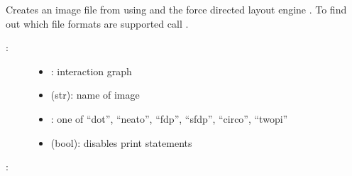 \documentclass[letterpaper,10pt,english]{sphinxmanual}
\begin{document}
\begin{fulllineitems}
\label{\detokenize{InteractionGraphs:PyBoolNet.InteractionGraphs.igraph2image}}
Creates an image file from  using {\hyperref[\detokenize{Installation:installation-graphviz}]{}} and the force directed layout engine .
To find out which file formats are supported call .
\begin{description}
\item[{:}] \leavevmode\begin{itemize}
\item {} 
: interaction graph

\item {} 
 (str): name of image

\item {} 
: one of “dot”, “neato”, “fdp”, “sfdp”, “circo”, “twopi”

\item {} 
 (bool): disables print statements

\end{itemize}

\end{description}

:

\begin{sphinxVerbatim}[commandchars=\\\{\}]
 
 
 
\end{sphinxVerbatim}

\end{fulllineitems}
\end{document}
